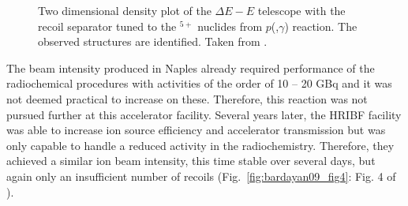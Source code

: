 \begin{figure}
\begin{center}
\caption{Two dimensional density plot of the $\Delta{}E-E$ telescope with the recoil separator tuned to the $^{5+}$ nuclides from $p$(,$\gamma$) reaction. The observed structures are identiﬁed. Taken from \cite{gial00}.}
\label{fig:gialanella00_fig2}
\end{center}
\end{figure}
The beam intensity produced in Naples already required performance of the radiochemical procedures with activities of the order of 10 -- 20 GBq and it was not deemed practical to increase on these. Therefore, this reaction was not pursued further at this accelerator facility. Several years later, the HRIBF facility was able to increase ion source efficiency and accelerator transmission but was only capable to handle a reduced activity in the radiochemistry. Therefore, they achieved a similar  ion beam intensity, this time stable over several days, but again only an insufficient number of recoils (Fig.\ \ref{fig:bardayan09_fig4}: Fig. 4 of \cite{bard09}).
